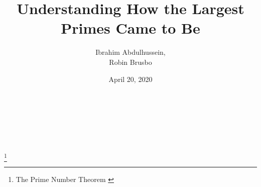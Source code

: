 \documentclass[main.tex]{subfiles}
\begin{document}
\title{Understanding How the Largest Primes Came to Be}
\author{Ibrahim Abdulhussein, \\ Robin Brusbo}
\date{April 20, 2020}

\makeatletter

\begin{titlepage}
    \thispagestyle{fancy}
    \renewcommand{\headrulewidth}{0pt}
    \renewcommand{\footrulewidth}{0pt}
    \cfoot{}
    \hbox{}\vfill
    \begin{center}
        {\LARGE\@title}\\[2em]
        {\large\@author}\\[1em]
        {\large\@date}\\[6em]
        \\
        \footnote{The Prime Number Theorem \cite{theorem:prime_num}}
    \end{center}
    \vspace{3cm}\vfill
\end{titlepage}

\makeatother
\end{document}
